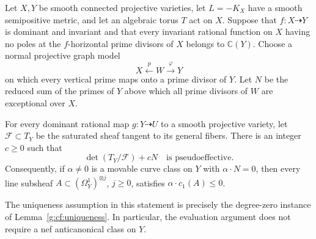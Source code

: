 \begin{proposition}\label{g:cf:evaluation-slope}
Let \(X,Y\) be smooth connected projective varieties, let
\(L=-K_X\) have a smooth semipositive metric, and let an algebraic
torus \(T\) act on \(X\).  Suppose that \(f:X\dashrightarrow Y\) is
dominant and invariant and that every invariant rational function on
\(X\) having no poles at the \(f\)-horizontal prime divisors of
\(X\) belongs to \(\mathbb C(Y)\).  Choose a normal projective graph
model
\[
 X\xleftarrow{p}W\xrightarrow{\varphi}Y
\]
on which every vertical prime maps onto a prime divisor of \(Y\).
Let \(N\) be the reduced sum of the primes of \(Y\) above which all
prime divisors of \(W\) are exceptional over \(X\).

For every dominant rational map \(g:Y\dashrightarrow U\) to a smooth
projective variety, let \(\mathcal F\subset T_Y\) be the saturated
sheaf tangent to its general fibers.  There is an integer \(c\geq0\)
such that
\[
 \det(T_Y/\mathcal F)+cN
 \quad\text{is pseudoeffective}.
\]
Consequently, if \(\alpha\ne0\) is a movable curve class on \(Y\)
with \(\alpha\cdot N=0\), then every line subsheaf
\(A\subset(\Omega_Y^1)^{\otimes j}\), \(j\geq0\), satisfies
\(\alpha\cdot c_1(A)\leq0\).
\end{proposition}

The uniqueness assumption in this statement is precisely the
degree-zero instance of Lemma~\ref{g:cf:uniqueness}.  In particular, the
evaluation argument does not require a nef anticanonical class on
\(Y\).


